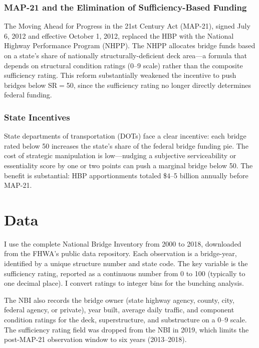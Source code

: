 \documentclass[12pt]{article}
\begin{document}
\subsubsection*{MAP-21 and the Elimination of Sufficiency-Based Funding} The Moving Ahead for Progress in the 21st Century Act (MAP-21), signed July 6, 2012 and effective October 1, 2012, replaced the HBP with the National Highway Performance Program (NHPP). The NHPP allocates bridge funds based on a state's share of nationally structurally-deficient deck area---a formula that depends on structural condition ratings (0--9 scale) rather than the composite sufficiency rating. This reform substantially weakened the incentive to push bridges below SR$=$50, since the sufficiency rating no longer directly determines federal funding.

\subsubsection*{State Incentives} State departments of transportation (DOTs) face a clear incentive: each bridge rated below 50 increases the state's share of the federal bridge funding pie. The cost of strategic manipulation is low---nudging a subjective serviceability or essentiality score by one or two points can push a marginal bridge below 50. The benefit is substantial: HBP apportionments totaled \$4--5 billion annually before MAP-21.


\section{Data}

I use the complete National Bridge Inventory from 2000 to 2018, downloaded from the FHWA's public data repository. Each observation is a bridge-year, identified by a unique structure number and state code. The key variable is the sufficiency rating, reported as a continuous number from 0 to 100 (typically to one decimal place). I convert ratings to integer bins for the bunching analysis.

The NBI also records the bridge owner (state highway agency, county, city, federal agency, or private), year built, average daily traffic, and component condition ratings for the deck, superstructure, and substructure on a 0--9 scale. The sufficiency rating field was dropped from the NBI in 2019, which limits the post-MAP-21 observation window to six years (2013--2018).


\end{document}
